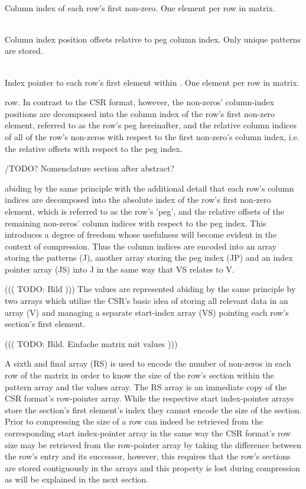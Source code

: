 \documentclass{article}
\begin{document}
    \begin{description}[align = left, labelwidth = 4cm]
      \item [JP - \emph{Peg column index}] \hfill \\
        Column index of each row's first non-zero. One element per row in matrix.
      \item [J - \emph{Column index patterns}] \hfill \\
        Column index position offsets relative to peg column index. Only unique patterns are stored.
      \item [JS - \emph{Pattern index pointer}] \hfill \\
        Index pointer to each row's first element within \J. One element per row in matrix.
    \end{description}

    row. In contrast to the CSR format, however, the non-zeros' column-index positions are decomposed into the column index of the row's first non-zero element, referred to as the row's peg hereinafter, and the relative column indices of all of the row's non-zeros with respect to the first non-zero's column index, i.e. the relative offsets with respect to the peg index.

    /TODO? Nomenclature section after abstract?
    
    abiding by the same principle with the additional detail that each row's column indices are decomposed into the absolute index of the row's first non-zero element, which is referred to as the row's 'peg', and the relative offsets of the remaining non-zeros' column indices with respect to the peg index.  This introduces a degree of freedom whose usefulness will become evident in the context of compression. Thus the column indices are encoded into an array storing the patterns (J), another array storing the peg index (JP) and an index pointer array (JS) into J in the same way that VS relates to V.

      ((( TODO: Bild )))
    The values are represented abiding by the same principle by two arrays which utilize the CSR's basic idea of storing all relevant data in an array (V) and managing a separate start-index array (VS) pointing each row's section's first element.

      ((( TODO: Bild. Einfache matrix mit values )))


    A sixth and final array (RS) is used to encode the number of non-zeros in each row of the matrix in order to know the size of the row's section within the pattern array and the values array. The RS array is an immediate copy of the CSR format's row-pointer array.  While the respective start index-pointer arrays store the section's first element's index they cannot encode the size of the section. Prior to compressing the size of a row can indeed be retrieved from the corresponding start index-pointer array in the same way the CSR format's row size may be retrieved from the row-pointer array by taking the difference between the row's entry and its successor, however, this requires that the row's sections are stored contiguously in the arrays and this property is lost during compression as will be explained in the next section.
\end{document}
